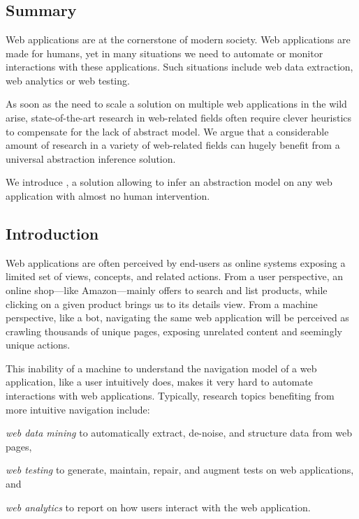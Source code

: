 \chapter{\appstract{}}\label{chap:appstract}

\section*{Summary}
Web applications are at the cornerstone of modern society.
Web applications are made for humans, yet in many situations we need to automate or monitor interactions with these applications. Such situations include web data extraction, web analytics or web testing.

As soon as the need to scale a solution on multiple web applications in the wild arise, state-of-the-art research in web-related fields often require clever heuristics to compensate for the lack of abstract model.
We argue that a considerable amount of research in a variety of web-related fields can hugely benefit from a universal abstraction inference solution.

We introduce \appstract{}, a solution allowing to infer an abstraction model on any web application with almost no human intervention. 

\section{Introduction}\label{appstract:sec:introduction}
Web applications are often perceived by end-users as online systems exposing a limited set of views, concepts, and related actions.
From a user perspective, an online shop---like Amazon---mainly offers to search and list products, while clicking on a given product brings us to its details view. 
From a machine perspective, like a bot, navigating the same web application will be perceived as crawling thousands of unique pages, exposing unrelated content and seemingly unique actions.

This inability of a machine to understand the navigation model of a web application, like a user intuitively does, makes it very hard to automate interactions with web applications.
Typically, research topics benefiting from more intuitive navigation include:
\begin{inparaenum}[\it (a)]
    \item \emph{web data mining} to automatically extract, de-noise, and structure data from web pages,
    \item \emph{web testing} to generate, maintain, repair, and augment tests on web applications, and
    \item \emph{web analytics} to report on how users interact with the web application.
\end{inparaenum}

